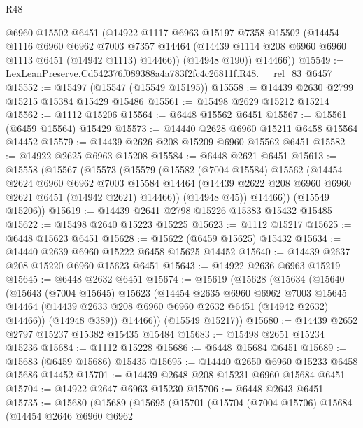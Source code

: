 \begin{lexlean}{R48}
\begin{coremodule}
        @6960
        @15502
        @6451
        (@14922
          @1117
          @6963
          @15197
          @7358
          @15502
          (@14454
            @1116
            @6960
            @6962
            @7003
            @7357
            @14464
            (@14439 @1114 @208 @6960 @6960 @1113 @6451 (@14942 @1113) @14466))
          (@14948 @190))
        @14466))
@15549 := LexLeanPreserve.Cd542376f089388a4a783f2fc4c26811f.R48.__rel_83 @6457
@15552 := @15497 (@15547 (@15549 @15195))
@15558 := @14439 @2630 @2799 @15215 @15384 @15429 @15486
@15561 := @15498 @2629 @15212 @15214
@15562 := @1112 @15206
@15564 := @6448 @15562 @6451
@15567 := @15561 (@6459 @15564) @15429
@15573 := @14440 @2628 @6960 @15211 @6458 @15564 @14452
@15579 := @14439 @2626 @208 @15209 @6960 @15562 @6451
@15582 := @14922 @2625 @6963 @15208
@15584 := @6448 @2621 @6451
@15613 := @15558
    (@15567
      (@15573
        (@15579
          (@15582
            (@7004 @15584)
            @15562
            (@14454
              @2624
              @6960
              @6962
              @7003
              @15584
              @14464
              (@14439 @2622 @208 @6960 @6960 @2621 @6451 (@14942 @2621) @14466))
            (@14948 @45))
          @14466))
      (@15549 @15206))
@15619 := @14439 @2641 @2798 @15226 @15383 @15432 @15485
@15622 := @15498 @2640 @15223 @15225
@15623 := @1112 @15217
@15625 := @6448 @15623 @6451
@15628 := @15622 (@6459 @15625) @15432
@15634 := @14440 @2639 @6960 @15222 @6458 @15625 @14452
@15640 := @14439 @2637 @208 @15220 @6960 @15623 @6451
@15643 := @14922 @2636 @6963 @15219
@15645 := @6448 @2632 @6451
@15674 := @15619
    (@15628
      (@15634
        (@15640
          (@15643
            (@7004 @15645)
            @15623
            (@14454
              @2635
              @6960
              @6962
              @7003
              @15645
              @14464
              (@14439 @2633 @208 @6960 @6960 @2632 @6451 (@14942 @2632) @14466))
            (@14948 @389))
          @14466))
      (@15549 @15217))
@15680 := @14439 @2652 @2797 @15237 @15382 @15435 @15484
@15683 := @15498 @2651 @15234 @15236
@15684 := @1112 @15228
@15686 := @6448 @15684 @6451
@15689 := @15683 (@6459 @15686) @15435
@15695 := @14440 @2650 @6960 @15233 @6458 @15686 @14452
@15701 := @14439 @2648 @208 @15231 @6960 @15684 @6451
@15704 := @14922 @2647 @6963 @15230
@15706 := @6448 @2643 @6451
@15735 := @15680
    (@15689
      (@15695
        (@15701
          (@15704
            (@7004 @15706)
            @15684
            (@14454
              @2646
              @6960
              @6962

\end{coremodule}
\end{lexlean}
